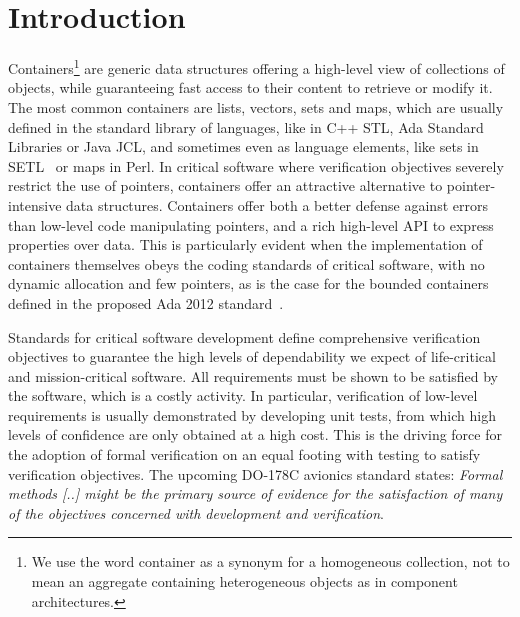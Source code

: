 \documentclass[runningheads,a4paper]{llncs}
\newcommand{\aftersec}{\vspace{-0.2cm}}
\begin{document}
\vspace{-0.5cm}
\section{Introduction}
\aftersec

Containers\footnote{We use the word container as a synonym for a homogeneous
  collection, not to mean an aggregate containing heterogeneous objects as in
  component architectures.} are generic data structures offering a high-level
view of collections of objects, while guaranteeing fast access to their content
to retrieve or modify it. The most common containers are lists, vectors, sets
and maps, which are usually defined in the standard library of languages, like
in C++ STL, Ada Standard Libraries or Java JCL, and sometimes even as language
elements, like sets in SETL~\cite{schwartz:1986} or maps in Perl.
In critical software where
verification objectives severely restrict the use of pointers, containers offer
an attractive alternative to pointer-intensive data structures. 
Containers offer both a better defense against errors than low-level code 
manipulating pointers, and a rich high-level API to express properties over 
data. 
This is
particularly evident when the implementation of containers themselves obeys the
coding standards of critical software, with no dynamic allocation and few
pointers, as is the case for the bounded containers defined in the proposed Ada
2012 standard~\cite{ada2012}.

Standards for critical software development define comprehensive verification
objectives to guarantee the high levels of dependability we expect of
life-critical and mission-critical software. All requirements must be shown to
be satisfied by the software, which is a costly activity. In particular,
verification of low-level requirements is usually demonstrated by developing
unit tests, from which high levels of confidence are only obtained at a high
cost. This is the driving force for the adoption of formal verification on an
equal footing with testing to satisfy verification objectives. The upcoming
DO-178C avionics standard states: \textit{Formal methods [..] might
  be the primary source of evidence for the satisfaction of many of the
  objectives concerned with development and verification}.
\end{document}
